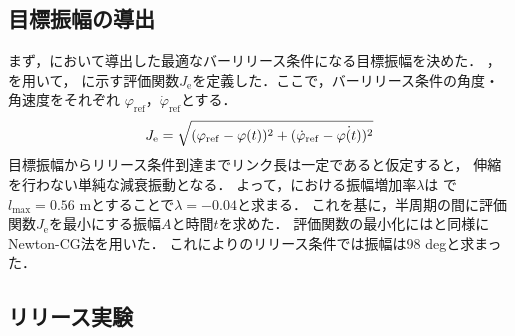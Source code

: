         \subsection{目標振幅の導出}
          まず，において導出した最適なバーリリース条件になる目標振幅を決めた．
          ，を用いて，
          に示す評価関数$J_{\mathrm{e}}$を定義した．ここで，バーリリース条件の角度・角速度をそれぞれ
          $\varphi_{\mathrm{ref}}$，$\dot{\varphi}_{\mathrm{ref}}$とする．
          \begin{eqnarray}
            \equlabel{error}
            J_{\mathrm{e}}=\sqrt{(\varphi_{\mathrm{ref}}-\varphi(t))^2+(\dot{\varphi}_{\mathrm{ref}}-\dot{\varphi(t)})^2}
          \end{eqnarray}
          目標振幅からリリース条件到達までリンク長は一定であると仮定すると，
          伸縮を行わない単純な減衰振動となる．
          よって，における振幅増加率$\lambda$は
          で$l_{\mathrm{max}}=0.56$ mとすることで$\lambda=-0.04$と求まる．
          これを基に，半周期の間に評価関数$J_{\mathrm{e}}$を最小にする振幅$A$と時間$t$を求めた．
          評価関数の最小化にはと同様にNewton-CG法を用いた．
          これによりのリリース条件では振幅は98 degと求まった．
          
          \subsection{リリース実験}

